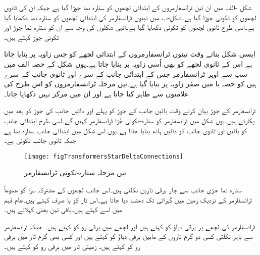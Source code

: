 شکل -الف میں ان تین ٹرانسفارمروں کے ابتدائی لچھوں کو ستارہ نما جوڑا گیا ہے جبکہ ان کی ثانوی لچھوں کو تکونی جوڑا گیا ہے۔شکل-ب میں تینوں ٹرانسفارمر کی ابتدائی لچھوں کو  ستارہ نما  دکھایا گیا ہے۔اسی طرح ثانوی لچھوں کو تکونی  دکھایا گیا ہے۔انہی شکلوں کی وجہ سے ان کو ستارہ نما جوڑ اور تکونی جوڑ کہتے ہیں۔

ایسی شکل بناتے وقت تینوں ٹرانسفارمروں کے ابتدائی لچھے کو جس زاویہ پر بنایا جاتا ہے اس کے ثانوی لچھے کو بھی اُسی زاویہ پر بنایا جاتا ہے۔یوں شکل کے حصہ الف میں سب سے اوپر ٹرانسفارمر جس کے ابتدائی جانب کے  سرے  اور ثانوی جانب  کے سرے  ہیں کو حصہ با میں صفر زاویہ پر بنایا گیا ہے۔تین  مرحلہ ٹرانسفارمروں کو اس طرح کی علامتوں سے ظاہر کیا جاتا ہے اور ان میں مرکز نہیں دکھایا جاتا۔

ٹرانسفارمر کے جوڑ بیان کرتے وقت بائیں جانب کے جوڑ کو پہلے اور دائیں جانب کی جوڑ کو بعد میں پکارتے ہیں۔یوں شکل میں ٹرانسفارمر کو ستارہ-تکونی جُڑا ٹرانسفارمر کہیں گے۔اسی طرح ابتدائی جانب کو بائیں اور ثانوی جانب کو دائیں ہاتھ بنایا جاتا ہے۔یوں اس شکل میں ابتدائی جانب ستارہ نما ہے جبکہ ثانوی جانب تکونی ہے۔
\begin{figure}
\centering
\texttt{[image: figTransformersStarDeltaConnections]}
\caption{تین مرحلہ ستارہ-تکونی ٹرانسفارمر}
\label{شکل_ٹرانسفارمر_ستارہ_تکونی_جوڑ}
\end{figure}


	ستارہ نما جڑی جانب سے چار برقی تاریں نکلتی ہیں۔اس جانب لچھوں کے مشترکہ سرا  کو عموماً ٹرانسفارمر کے نزدیک زمین میں گہرائی تک دھنسا دیا جاتا ہے۔اس تار کو   یا صرف   کہتے ہیں۔عام فہم میں اسے  کہتے ہیں۔باقی تین یعنی    کہلاتے ہیں۔

ٹرانسفارمر کی لچھے پر برقی دباؤ کو   کہتے ہیں اور لچھے میں برقی رو کو    کہتے ہیں۔ جبکہ ٹرانسفارمر سے باہر نکلتی کسی دو گرم تاروں کے مابین برقی دباؤ کو   کہتے ہیں اور کسی بھی گرم تار میں برقی رو کو    کہتے ہیں۔ زمینی تار میں برقی رو کو    کہتے ہیں۔


